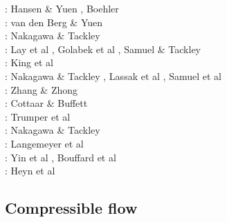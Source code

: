 \begin{scriptsize}
\nineteenninetysix: Hansen \& Yuen \cite{hayu96}, Boehler \cite{boeh96}\\
\nineteenninetyeight: van den Berg \& Yuen \cite{vayu98}\\
\twothousandfour: Nakagawa \& Tackley \cite{nata04c}\\
\twothousandeight: Lay et al \cite{lahb08}, Golabek et al \cite{gost08}, Samuel \& Tackley \cite{sata08}\\
\twothousandnine: King et al \cite{kisn09}\\
\twothousandten: Nakagawa \& Tackley \cite{nata10}, Lassak et al \cite{lamg10}, Samuel et al \cite{sate10}\\
\twothousandeleven: Zhang \& Zhong  \cite{zhzh11}\\
\twothousandtwelve: Cottaar \& Buffett  \cite{cobu12}\\
\twothousandtwelve: Trumper et al  \cite{trbh12}\\
\twothousandthirteen: Nakagawa \& Tackley  \cite{nata13}\\
\twothousandeighteen: Langemeyer et al  \cite{lalt18}\\
\twothousandnineteen: Yin et al  \cite{yiym19}, Bouffard et al \cite{bocl19}\\
\twothousandtwenty: Heyn et al \cite{hect20}
\end{scriptsize}


\subsection{Compressible flow}

